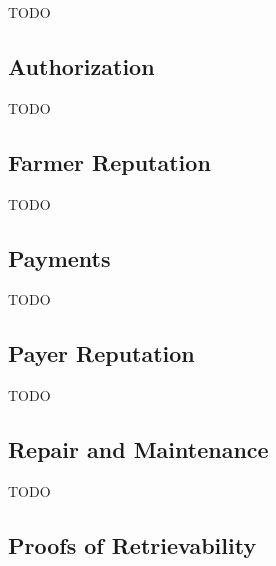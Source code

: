 \documentclass[a4paper,10pt]{article}
\newcommand{\todo}[1]{{\color{red} TODO #1}}
\begin{document}
\todo{}

\subsection{Authorization}

\todo{}

\subsection{Farmer Reputation}

\todo{}

\subsection{Payments}

\todo{}

\subsection{Payer Reputation}

\todo{}

\subsection{Repair and Maintenance}

\todo{}

\subsection{Proofs of Retrievability}
\end{document}
